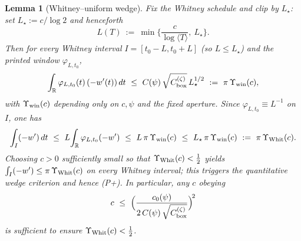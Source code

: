 \documentclass[11pt]{article}
\newtheorem{lemma}[theorem]{Lemma}
\theoremstyle{definition}
\theoremstyle{remark}
\begin{document}
\begin{lemma}[Whitney--uniform wedge]\label{lem:whitney-uniform-wedge}
Fix the Whitney schedule and clip by $L_\star$: set $L_\star:=c/\log 2$ and henceforth
\[
  L(T)\ :=\ \min\Big\{\frac{c}{\log\langle T\rangle},\ L_\star\Big\}.
\]
Then for every Whitney interval $I=[t_0-L,t_0+L]$ (so $L\le L_\star$) and the printed window $\varphi_{L,t_0}$,
\[
  \int_{\mathbb R} \varphi_{L,t_0}(t)\,(-w'(t))\,dt\ \le\ C(\psi)\,\sqrt{C_{\rm box}^{(\zeta)}}\,L_\star^{1/2}
  \ :=\ \pi\,\Upsilon_{\rm win}(c),
\]
with $\Upsilon_{\rm win}(c)$ depending only on $c,\psi$ and the fixed aperture. Since $\varphi_{L,t_0}\equiv L^{-1}$ on $I$, one has
\[
  \int_I (-w')\,dt\ \le\ L\!\int_{\mathbb R} \varphi_{L,t_0}(-w')\ \le\ L\,\pi\,\Upsilon_{\rm win}(c)\ \le\ L_\star\,\pi\,\Upsilon_{\rm win}(c)
  \ :=\ \pi\,\Upsilon_{\rm Whit}(c).
\]
Choosing $c>0$ sufficiently small so that $\Upsilon_{\rm Whit}(c)<\tfrac12$ yields $\int_I(-w')\le \pi\,\Upsilon_{\rm Whit}(c)$ on every Whitney interval; this triggers the quantitative wedge criterion and hence \textup{(P+)}. In particular, any $c$ obeying
\[
  c\ \le\ \Big(\frac{c_0(\psi)}{2\,C(\psi)\,\sqrt{C_{\rm box}^{(\zeta)}}}\Big)^{\!2}
\]
is sufficient to ensure $\Upsilon_{\rm Whit}(c)<\tfrac12$.
\end{lemma}
\end{document}

